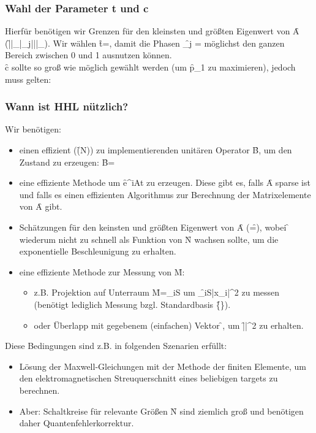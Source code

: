 \subsubsection{Wahl der Parameter t und c}
Hierfür benötigen wir Grenzen für den kleinsten und größten Eigenwert von \f{A} (\f{|\lambda|_{\min}\leq|\lambda_j|\leq|\lambda|_{\max}}). Wir wählen \f{t=\frac{2\pi}{|\lambda|_{\max}}}, damit die Phasen \f{\varphi_j = } möglichst den ganzen Bereich zwischen 0 und 1 ausnutzen können.\\
\f{c} sollte so groß wie möglich gewählt werden (um \f{p_1} zu maximieren), jedoch muss gelten:

\subsubsection{Wann ist HHL nützlich?}
Wir benötigen:
\begin{itemize}
    \item einen effizient (\f{\propto \log(N)}) zu implementierenden unitären Operator \f{B}, um den Zustand  zu erzeugen: \f{B=}
    \item eine effiziente Methode um \f{e^{iAt}} zu erzeugen. Diese gibt es, falls \f{A} sparse ist und falls es einen effizienten Algorithmus zur Berechnung der Matrixelemente von \f{A} gibt.
    \item Schätzungen für den keinsten und größten Eigenwert von \f{A} (\f{\rightarrow\kappa=\frac{|\lambda|_{\max}}{\lambda|_{\min}}}), wobei \f{\kappa} wiederum nicht zu schnell als Funktion von \f{N} wachsen sollte, um die exponentielle Beschleunigung zu erhalten.
    \item eine effiziente Methode zur Messung von \f{M}:
    \begin{itemize}
        \item z.B. Projektion auf Unterraum \f{M=\sum_{i\in S}} um \f{\sum_{i\in S}|x_i|^2} zu messen (benötigt lediglich Messung bzgl. Standardbasis \f{\left\{\right\}}).
        \item oder Überlapp mit gegebenem (einfachen) Vektor \f{}, um \f{|\cdot{}|^2} zu erhalten.
    \end{itemize}
\end{itemize}
Diese Bedingungen sind z.B. in folgenden Szenarien erfüllt:
\begin{itemize}
    \item Lösung der Maxwell-Gleichungen mit der Methode der finiten Elemente, um den elektromagnetischen Streuquerschnitt eines beliebigen targets zu berechnen.
    \item Aber: Schaltkreise für relevante Größen \f{N} sind ziemlich groß und benötigen daher Quantenfehlerkorrektur.
\end{itemize}

